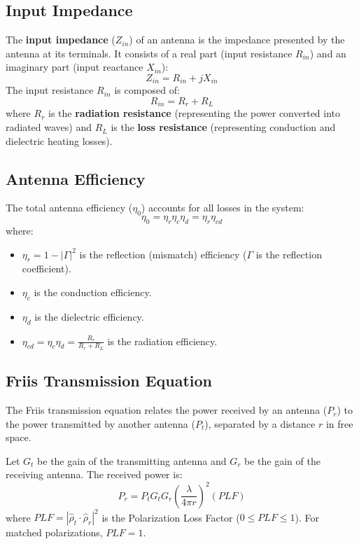 \documentclass[12pt,a4paper]{article}
\begin{document}
\subsection{Input Impedance}
The \textbf{input impedance} ($Z_{in}$) of an antenna is the impedance presented by the antenna at its terminals. It consists of a real part (input resistance $R_{in}$) and an imaginary part (input reactance $X_{in}$):
\[
Z_{in} = R_{in} + j X_{in}
\]
The input resistance $R_{in}$ is composed of:
\[
R_{in} = R_r + R_L
\]
where $R_r$ is the \textbf{radiation resistance} (representing the power converted into radiated waves) and $R_L$ is the \textbf{loss resistance} (representing conduction and dielectric heating losses).

\subsection{Antenna Efficiency}
The total antenna efficiency ($\eta_0$) accounts for all losses in the system:
\[
\eta_0 = \eta_r \eta_c \eta_d = \eta_r \eta_{cd}
\]
where:
\begin{itemize}[leftmargin=*, itemsep=1pt]
  \item $\eta_r = 1 - |\Gamma|^2$ is the reflection (mismatch) efficiency ($\Gamma$ is the reflection coefficient).
  \item $\eta_c$ is the conduction efficiency.
  \item $\eta_d$ is the dielectric efficiency.
  \item $\eta_{cd} = \eta_c \eta_d = \frac{R_r}{R_r + R_L}$ is the radiation efficiency.
\end{itemize}

\subsection{Friis Transmission Equation}
The Friis transmission equation relates the power received by an antenna ($P_r$) to the power transmitted by another antenna ($P_t$), separated by a distance $r$ in free space.

\begin{tcolorbox}[formulabox, title={\textbf{Friis Transmission Formula}}]
Let $G_t$ be the gain of the transmitting antenna and $G_r$ be the gain of the receiving antenna. The received power is:
\[
P_r = P_t G_t G_r \left( \frac{\lambda}{4\pi r} \right)^{\!2} (PLF)
\]
where $PLF = |\hat{\rho}_t \cdot \hat{\rho}_r|^2$ is the Polarization Loss Factor ($0 \le PLF \le 1$). For matched polarizations, $PLF = 1$.
\end{tcolorbox}
\end{document}
